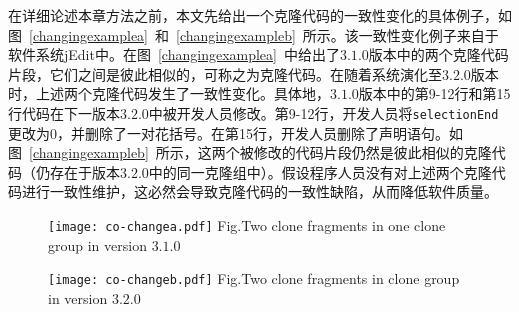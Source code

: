 在详细论述本章方法之前，本文先给出一个克隆代码的一致性变化的具体例子，如图~\ref{changingexamplea}~和~\ref{changingexampleb}~所示。该一致性变化例子来自于软件系统jEdit中。在图~\ref{changingexamplea}~中给出了$ 3.1.0 $版本中的两个克隆代码片段，它们之间是彼此相似的，可称之为克隆代码。在随着系统演化至$ 3.2.0 $版本时，上述两个克隆代码发生了一致性变化。具体地，$ 3.1.0 $版本中的第9-12行和第15行代码在下一版本$ 3.2.0 $中被开发人员修改。第9-12行，开发人员将{\tt selectionEnd}更改为$ 0 $，并删除了一对花括号。在第15行，开发人员删除了声明语句。如图~\ref{changingexampleb}~所示，这两个被修改的代码片段仍然是彼此相似的克隆代码（仍存在于版本$ 3.2.0 $中的同一克隆组中）。假设程序人员没有对上述两个克隆代码进行一致性维护，这必然会导致克隆代码的一致性缺陷，从而降低软件质量。

\begin{figure}[htbp]
\centering
\texttt{[image: co-changea.pdf]}
{Fig.$\!$}{Two clone fragments in one clone group in version $3.1.0$}
\vspace{-1em}
\end{figure}

\begin{figure}[htbp]
\centering
\texttt{[image: co-changeb.pdf]}
{Fig.$\!$}{Two clone fragments in clone group in version $3.2.0$}
\vspace{-1em}
\end{figure}


